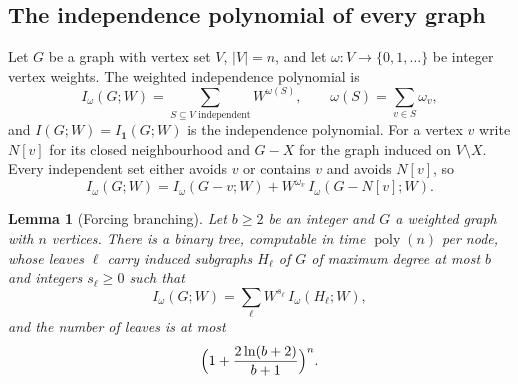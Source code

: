 \documentclass[11pt,reqno]{amsart}
\numberwithin{equation}{section}
\theoremstyle{plain}
\newtheorem{lemma}[theorem]{Lemma}
\theoremstyle{definition}
\theoremstyle{remark}
\DeclareMathOperator{\poly}{poly}
\begin{document}
\subsection{The independence polynomial of every graph}\label{ssec:indep}
Let $G$ be a graph with vertex set $V$, $|V|=n$, and let $\omega:V\to\{0,1,\dots\}$
be integer vertex weights. The weighted independence polynomial is
\begin{equation}\label{eq:indeppoly}
  I_\omega(G;W)=\sum_{S\subseteq V\text{ independent}}W^{\omega(S)},\qquad \omega(S)=\sum_{v\in S}\omega_v ,
\end{equation}
and $I(G;W)=I_{\mathbf 1}(G;W)$ is the independence polynomial. For a vertex $v$
write $N[v]$ for its closed neighbourhood and $G-X$ for the graph induced on
$V\setminus X$. Every independent set either avoids $v$ or contains $v$ and
avoids $N[v]$, so
\begin{equation}\label{eq:indeprec}
  I_\omega(G;W)=I_\omega(G-v;W)+W^{\omega_v}\,I_\omega(G-N[v];W).
\end{equation}

\begin{lemma}[Forcing branching]\label{lem:branch}
Let $b\ge2$ be an integer and $G$ a weighted graph with $n$ vertices. There is a
binary tree, computable in time $\poly(n)$ per node, whose leaves $\ell$ carry
induced subgraphs $H_\ell$ of $G$ of maximum degree at most $b$ and integers
$s_\ell\ge0$ such that
\begin{equation}\label{eq:branchexp}
  I_\omega(G;W)=\sum_{\ell}W^{s_\ell}\,I_\omega(H_\ell;W),
\end{equation}
and the number of leaves is at most
\begin{equation}\label{eq:leaves}
  \Bigl(1+\frac{2\ln(b+2)}{b+1}\Bigr)^{n}.
\end{equation}
\end{lemma}
\end{document}
